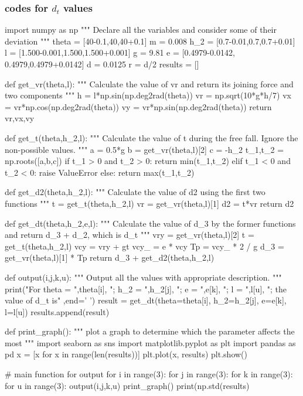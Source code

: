 \documentclass[conference]{IEEEtran}
\begin{document}
    \subsubsection{codes for $d_t$ values}
    \begin{python}
import numpy as np
"""
Declare all the variables
and consider some of their
deviation
"""
theta = [40-0.1,40,40+0.1] 
m = 0.008
h_2 = [0.7-0.01,0.7,0.7+0.01]
l = [1.500-0.001,1.500,1.500+0.001] 
g = 9.81
e = [0.4979-0.0142,
    0.4979,0.4979+0.0142] 
d = 0.0125
r = d/2
results = []

def get_vr(theta,l):
    """
    Calculate the value of vr and return
    its joining force and two components
    """
    h = l*np.sin(np.deg2rad(theta))
    vr = np.sqrt(10*g*h/7)
    vx = vr*np.cos(np.deg2rad(theta))
    vy = vr*np.sin(np.deg2rad(theta))
    return vr,vx,vy
    
def get_t(theta,h_2,l):
    """
    Calculate the value of t
    during the free fall.
    Ignore the non-possible values.
    """
    a = 0.5*g
    b = get_vr(theta,l)[2]
    c = -h_2
    t_1,t_2 = np.roots([a,b,c])
    if t_1 > 0 and t_2 > 0:
        return min(t_1,t_2)
    elif t_1 < 0 and t_2 < 0:
        raise ValueError
    else:
        return max(t_1,t_2)
        
def get_d2(theta,h_2,l):
    """
    Calculate the value of d2
    using the first two functions
    """
    t = get_t(theta,h_2,l)
    vr = get_vr(theta,l)[1]
    d2 = t*vr
    return d2
    
def get_dt(theta,h_2,e,l):
    """
    Calculate the value of d_3
    by the former functions and 
    return d_3 + d_2, which is 
    d_t
    """
    vry = get_vr(theta,l)[2]
    t = get_t(theta,h_2,l)
    vcy = vry + gt
    vcy_ = e * vcy
    Tp = vcy_ * 2 / g
    d_3 = get_vr(theta,l)[1] * Tp
    return d_3 + get_d2(theta,h_2,l)
    
def output(i,j,k,u):
    """
    Output all the values with
    appropriate description.
    """
    print("For theta = ",theta[i],
          "; h_2 = ",h_2[j],
          "; e = ",e[k],
          "; l = ",l[u],
          "; the value of d_t is"
          ,end=' ')
    result = get_dt(theta=theta[i],
                    h_2=h_2[j],
                    e=e[k],
                    l=l[u])
    results.append(result)

def print_graph():
    """
    plot a graph to determine which
    the parameter affects the most
    """
    import seaborn as sns
    import matplotlib.pyplot as plt
    import pandas as pd
    x = [x for x in range(len(results))]
    plt.plot(x, results)
    plt.show()

# main function for output     
for i in range(3):
    for j in range(3):
        for k in range(3):
            for u in range(3):
                output(i,j,k,u)
print_graph()
print(np.std(results)

    \end{python}
\end{document}

